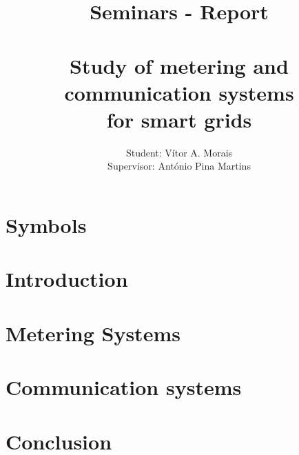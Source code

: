 \documentclass{report}%
\title{\vspace{-3.5cm} Seminars - Report \\
\hrulefill\\
 Study of metering and communication systems\\ for smart grids%
}
\author{Student: Vítor A. Morais\\
Supervisor: António Pina Martins }
\begin{document}
\maketitle



\tableofcontents


\printnomenclature

\chapter*{Symbols}


\chapter{Introduction}



\chapter{Metering Systems}


\chapter{Communication systems}


\chapter{Conclusion}





%
%
\end{document}
